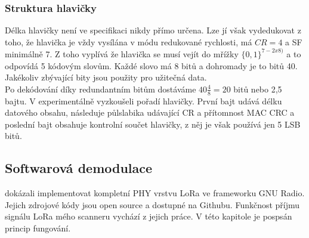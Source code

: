 \documentclass{ctuthesis}
\begin{document}
\subsubsection{Struktura hlavičky}
Délka hlavičky není ve specifikaci nikdy přímo určena. Lze jí však vydedukovat z toho, že hlavička je vždy vysílána v módu redukované rychlosti, má $CR =4$ a SF minimálně 7. Z toho vyplívá že hlavička se musí vejít do mřížky $\{0,1\}^{7-2 x 8)}$ a to odpovídá 5 kódovým slovům. Každé slovo má 8 bitů a dohromady je to bitů 40. Jakékoliv zbývající bity jsou použity pro užitečná data. \\
Po dekódování díky redundantním bitům dostáváme $40\frac{4}{8} = 20$ bitů nebo 2,5 bajtu. V \cite{gr-lora2018} experimentálně vyzkoušeli pořadí hlavičky. První bajt udává délku datového obsahu, následuje půlslabika  udávající CR a přítomnost MAC CRC a poslední bajt obsahuje kontrolní součet hlavičky, z něj je však používá jen 5 LSB bitů.

\subsection{Softwarová demodulace} \label{sec:softdem}
\cite{gr-lora2018} dokázali implementovat kompletní PHY vrstvu LoRa ve frameworku GNU Radio. Jejich zdrojové kódy jsou open source a dostupné na Githubu. Funkčnost příjmu signálu LoRa mého scanneru vychází z jejich práce. V této kapitole je pospsán princip fungování.
\end{document}
